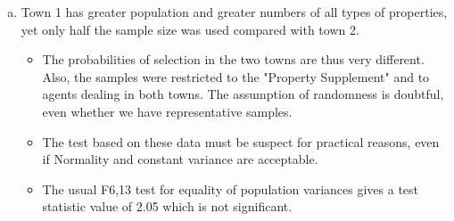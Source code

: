 \documentclass[a4paper,12pt]{article}
\begin{document}
\begin{enumerate}[(a)]
\begin{framed}
\end{framed}
    \item  Town 1 has greater population and greater numbers of all types of properties, yet only half the sample size was used compared with town 2.
    \begin{itemize}
        \item    The probabilities of selection in the two towns are thus very different. Also, the samples were restricted to the "Property Supplement" and to agents dealing in both towns. The assumption of randomness is doubtful, even whether we have representative samples. 
        \item The test based on these data must be suspect for practical reasons, even if Normality and constant variance are acceptable. 
        \item The usual F6,13 test for equality of population variances gives a test statistic value of 2.05 which is not significant.
    \end{itemize}
 
\end{enumerate}
\end{document}
